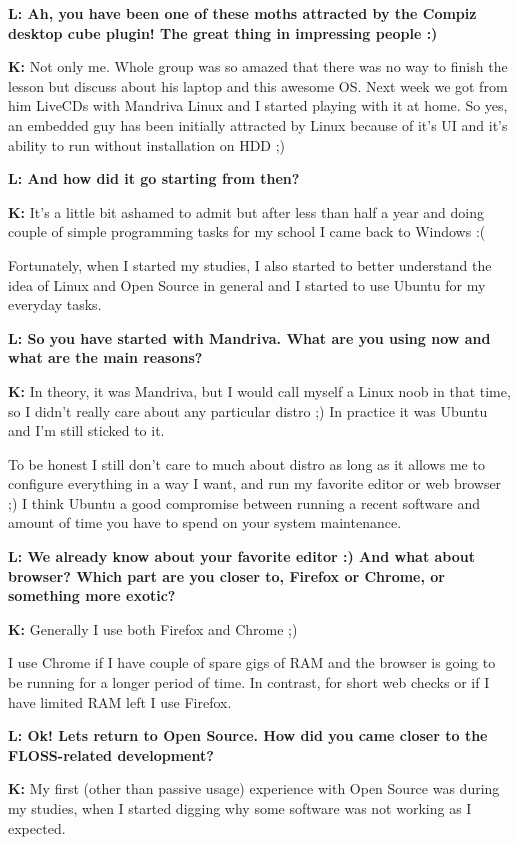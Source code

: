 \documentclass[10pt, a5paper]{article}
\begin{document}
\begin{Parallel}[p]{}{}
{{\noindent \bf L: Ah, you have been one of these moths attracted by the Compiz desktop cube plugin! The great thing in impressing people :) }

{\noindent \bf K:} Not only me. Whole group was so amazed that there was no way to finish the lesson but discuss about his laptop and this awesome OS.
Next week we got from him LiveCDs with Mandriva Linux and I started playing with it at home.
So yes, an embedded guy has been initially attracted by Linux because of it's UI and it's ability to run without installation on HDD ;)

{\noindent \bf L: And how did it go starting from then?}

{\noindent \bf K:} It's a little bit ashamed to admit but after less than half a year and doing couple of simple programming tasks for my school I came back to Windows :(

Fortunately, when I started my studies, I also started to better understand the idea of Linux and Open Source in general and I started to use Ubuntu for my everyday tasks.
 
{\noindent \bf L: So you have started with Mandriva. What are you using now and what are the main reasons?}

{\noindent \bf K:} In theory, it was Mandriva, but I would call myself a Linux noob in that time, so I didn't really care about any particular distro ;) In practice it was Ubuntu and I'm still sticked to it.

To be honest I still don't care to much about distro as long as it allows me to configure everything in a way I want, and run my favorite editor or web browser ;) 
I think Ubuntu a good compromise between running a recent software and amount of time you have to spend on your system maintenance.

{\noindent \bf L: We already know about your favorite editor :) And what about browser? Which part are you closer to, Firefox or Chrome, or something more exotic?}

{\noindent \bf K:} Generally I use both Firefox and Chrome ;)

I use Chrome if I have couple of spare gigs of RAM and the browser is going to be running for a longer period of time. In contrast, for short web checks or if I have limited RAM left I use Firefox.

{\noindent \bf L: Ok! Lets return to Open Source. How did you came closer to the FLOSS-related development?}

{\noindent \bf K:} My first (other than passive usage) experience with Open Source was during my studies, when I started digging why some software was not working as I expected.

}
\end{Parallel}
\end{document}
